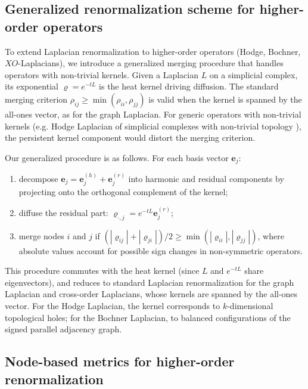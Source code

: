 \documentclass[twocolumn,superscriptaddress,tightenlines,aps,prx,floatfix]{revtex4-2}
\begin{document}
\begin{bibunit}
\subsection{Generalized renormalization scheme for higher-order operators}

To extend Laplacian renormalization to higher-order operators (Hodge, Bochner, $XO$-Laplacians), we introduce a generalized merging procedure that handles operators with non-trivial kernels. Given a Laplacian $L$ on a simplicial complex, its exponential $\varrho = e^{-t L}$ is the heat kernel driving diffusion. The standard merging criterion $\rho_{ij} \geq \min(\rho_{ii}, \rho_{jj})$ is valid when the kernel is spanned by the all-ones vector, as for the graph Laplacian. For generic operators with non-trivial kernels (e.g. Hodge Laplacian of simplicial complexes with non-trivial topology \cite{Muhammad2006Control_Higher_order_Laplacian}), the persistent kernel component would distort the merging criterion.

Our generalized procedure is as follows. For each basis vector $\mathbf{e}_j$: 
\begin{enumerate}
    \item decompose $\mathbf{e}_j = \mathbf{e}_j^{(h)} + \mathbf{e}_j^{(r)}$ into harmonic and residual components by projecting onto the orthogonal complement of the kernel; 
    \item diffuse the residual part: $\varrho_{\cdot,j} = e^{-t L} \mathbf{e}_j^{(r)}$; 
    \item merge nodes $i$ and $j$ if $(|\varrho_{ij}| + |\varrho_{ji}|)/2 \geq \min(|\varrho_{ii}|, |\varrho_{jj}|)$, where absolute values account for possible sign changes in non-symmetric operators.

\end{enumerate}

This procedure commutes with the heat kernel (since $L$ and $e^{-t L}$ share eigenvectors), and reduces to standard Laplacian renormalization for the graph Laplacian and cross-order Laplacians, whose kernels are spanned by the all-ones vector. 
For the Hodge Laplacian, the kernel corresponds to $k$-dimensional topological holes; for the Bochner Laplacian, to balanced configurations of the signed parallel adjacency graph.


\subsection{Node-based metrics for higher-order renormalization}


\end{bibunit}
\end{document}
